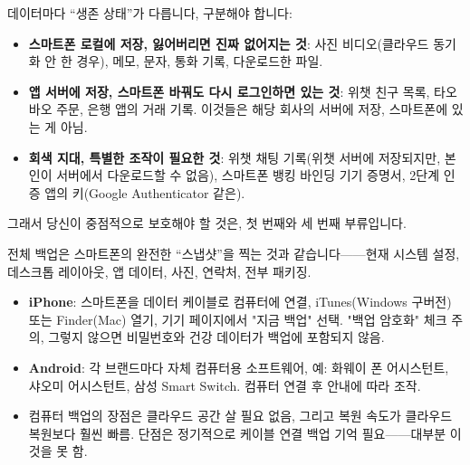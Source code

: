 


데이터마다 “생존 상태”가 다릅니다, 구분해야 합니다:

\begin{itemize}
  \item \textbf{스마트폰 로컬에 저장, 잃어버리면 진짜 없어지는 것}: 사진 비디오(클라우드 동기화 안 한 경우), 메모, 문자, 통화 기록, 다운로드한 파일.
  \item \textbf{앱 서버에 저장, 스마트폰 바꿔도 다시 로그인하면 있는 것}: 위챗 친구 목록, 타오바오 주문, 은행 앱의 거래 기록. 이것들은 해당 회사의 서버에 저장, 스마트폰에 있는 게 아님.
  \item \textbf{회색 지대, 특별한 조작이 필요한 것}: 위챗 채팅 기록(위챗 서버에 저장되지만, 본인이 서버에서 다운로드할 수 없음), 스마트폰 뱅킹 바인딩 기기 증명서, 2단계 인증 앱의 키(Google Authenticator 같은).
\end{itemize}

그래서 당신이 중점적으로 보호해야 할 것은, 첫 번째와 세 번째 부류입니다.


전체 백업은 스마트폰의 완전한 “스냅샷”을 찍는 것과 같습니다——현재 시스템 설정, 데스크톱 레이아웃, 앱 데이터, 사진, 연락처, 전부 패키징.


\begin{itemize}
  \item \textbf{iPhone}: 스마트폰을 데이터 케이블로 컴퓨터에 연결, iTunes(Windows 구버전) 또는 Finder(Mac) 열기, 기기 페이지에서 "지금 백업" 선택. "백업 암호화" 체크 주의, 그렇지 않으면 비밀번호와 건강 데이터가 백업에 포함되지 않음.
  \item \textbf{Android}: 각 브랜드마다 자체 컴퓨터용 소프트웨어, 예: 화웨이 폰 어시스턴트, 샤오미 어시스턴트, 삼성 Smart Switch. 컴퓨터 연결 후 안내에 따라 조작.
  \item 컴퓨터 백업의 장점은 클라우드 공간 살 필요 없음, 그리고 복원 속도가 클라우드 복원보다 훨씬 빠름. 단점은 정기적으로 케이블 연결 백업 기억 필요——대부분 이것을 못 함.
\end{itemize}


